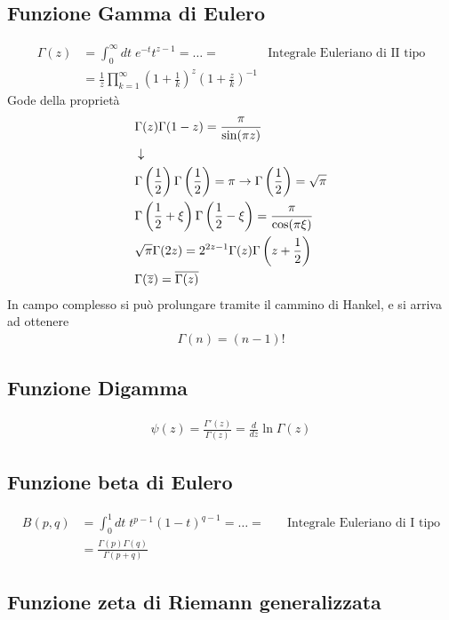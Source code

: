 \subsection{Funzione Gamma di Eulero}
\begin{align}
	\Gamma(z) &= \int_{0}^{\infty} dt \; e^{-t} t^{z-1} = \dots =  \quad &\text{Integrale Euleriano di II tipo}\\
	&= \frac{1}{z} \prod_{k=1}^{\infty} \left( 1+ \frac{1}{k} \right)^z \left( 1+ \frac{z}{k} \right)^{-1}
\end{align}
Gode della proprietà	
\begin{align}
	&\Gamma(z) \Gamma(1-z) = \frac{\pi}{\sin(\pi z)} \\ &\downarrow \nonumber \\
	&\Gamma\left(\frac{1}{2}\right) \Gamma\left(\frac{1}{2}\right) = \pi \rightarrow \Gamma \left( \frac{1}{2} \right) = \sqrt{\pi} \\
	&\Gamma\left(\frac{1}{2} + \xi\right) \Gamma\left(\frac{1}{2} - \xi\right) = \frac{\pi}{\cos(\pi \xi)}\\
	&\sqrt{\pi} \Gamma(2z) = 2^{2z-1} \Gamma(z) \Gamma \left( z + \frac{1}{2} \right)\\
	&\Gamma(\overline{z}) = \overline{\Gamma(z)}
\end{align}
In campo complesso si può prolungare tramite il cammino di Hankel, e si arriva ad ottenere
\begin{align}
	\Gamma(n) = (n-1)!
\end{align}

\subsection{Funzione Digamma}
\begin{align}
	\psi(z) = \frac{\Gamma'(z)}{\Gamma(z)} = \frac{d}{dz} \ln \Gamma (z)
\end{align}
\subsection{Funzione beta di Eulero}
\begin{align}
	B(p,q) &= \int_{0}^{1} dt \; t^{p-1} (1-t)^{q-1} = \dots =  \quad &\text{Integrale Euleriano di I tipo}\\
	&= \frac{\Gamma(p)\Gamma(q)}{\Gamma(p+q)}
\end{align}

\subsection{Funzione zeta di Riemann generalizzata}

